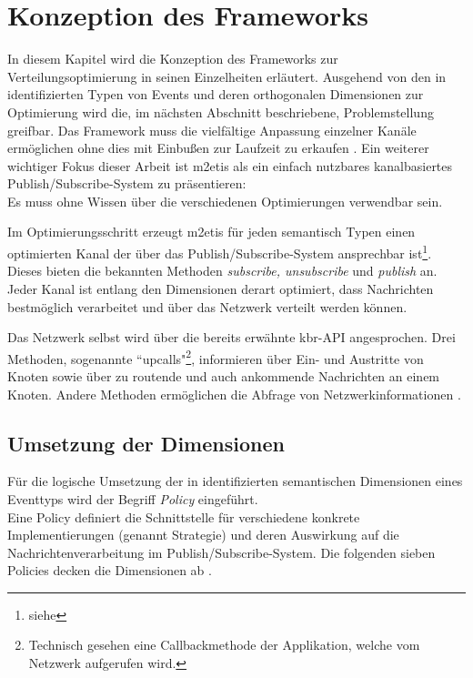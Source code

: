 \chapter{Konzeption des Frameworks}
\label{chap:konzeption_pubsub}
In diesem Kapitel wird die Konzeption des Frameworks zur Verteilungsoptimierung in seinen Einzelheiten erläutert. Ausgehend von den in \cite{Fischer2010a} identifizierten Typen von Events und deren orthogonalen Dimensionen zur Optimierung wird die, im nächsten Abschnitt beschriebene, Problemstellung greifbar. Das Framework muss die vielfältige Anpassung einzelner Kanäle ermöglichen ohne dies mit Einbußen zur Laufzeit zu erkaufen \cite{NEW_PAPER} . Ein weiterer wichtiger Fokus dieser Arbeit ist \ac{m2etis} als ein einfach nutzbares kanalbasiertes Publish/Subscribe-System zu präsentieren:\\
Es muss ohne Wissen über die verschiedenen Optimierungen verwendbar sein.

Im Optimierungsschritt erzeugt \ac{m2etis} für jeden semantisch Typen einen optimierten Kanal der über das Publish/Subscribe-System ansprechbar ist\footnote{siehe }. Dieses bieten die bekannten Methoden \emph{subscribe, unsubscribe} und \emph{publish} an. Jeder Kanal ist entlang den Dimensionen derart optimiert, dass Nachrichten bestmöglich verarbeitet und über das Netzwerk verteilt werden können.

Das Netzwerk selbst wird über die bereits erwähnte \ac{kbr}-API angesprochen. Drei Methoden, sogenannte ``upcalls"\footnote{Technisch gesehen eine Callbackmethode der Applikation, welche vom Netzwerk aufgerufen wird.},  informieren über Ein- und Austritte von Knoten sowie über zu routende und auch ankommende Nachrichten an einem Knoten. Andere Methoden ermöglichen die Abfrage von Netzwerkinformationen \cite{Dabek2003Towards}.

\section{Umsetzung der Dimensionen}
Für die logische Umsetzung der in \cite{Fischer2010Event} identifizierten semantischen Dimensionen eines Eventtyps wird der Begriff \emph{Policy} eingeführt.\\
Eine Policy definiert die Schnittstelle für verschiedene konkrete Implementierungen (genannt Strategie) und deren Auswirkung auf die Nachrichtenverarbeitung im Publish/Subscribe-System. Die folgenden sieben Policies decken die Dimensionen ab \cite{NEW_PAPER}.

